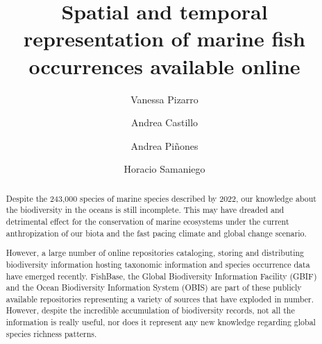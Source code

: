 \documentclass[12pt,authoryear]{elsarticle}
\begin{document}
\begin{frontmatter}

  \title{
    Spatial and temporal representation of marine fish occurrences available online
  } 
  \author[ecoinfo]{Vanessa Pizarro}
  \author[ecoinfo,uach]{Andrea Castillo}
  \author[icml,FONDAP,COPAS,BASE]{Andrea Pi\~nones}
  \author[ecoinfo,iscv]{Horacio Samaniego}

  \address[ecoinfo]{Laboratorio de Ecoinform\'atica, Instituto de Conservación, Biodiersidad y Territorio, Universidad Austral de Chile, Valdivia, Chile}
  \address [uach] {Programa de Doctorado en Ciencias mención Ecología y Evolución, Escuela de Graduados, Facultad de Ciencias, Universidad Austral de Chile, Valdivia, Chile}
  \address[icml] {Instituto de Ciencias Marinas y Limnológicas, Facultad de Ciencias, Universidad Austral de Chile, Valdivia, Chile}
  \address[FONDAP]{Centro FONDAP de Investigación en Dinámica de Ecosistemas Marinos de Altas Latitudes (IDEAL), Valdivia, Chile.}
  \address[COPAS]{Centro de Investigaci\'on Oceanogr\'afica COPAS-COASTAL, Universidad de Concepci\'on, Chile}
  \address[BASE]{Millenium Institute Biodiversity of Antarctic and Subantarctic Ecosystems - BASE, Chile}
  \address[iscv]{Instituto de Sistemas Complejos de Valpara\'iso, Subida Artiller\'ia 470, Valpara\'iso, Chile}



\linenumbers
\singlespacing

\begin{abstract} 

Despite the 243,000 species of  marine species described by 2022, our knowledge about the biodiversity in the oceans is still incomplete. This may have dreaded and detrimental effect for the conservation of marine ecosystems under the current anthropization of our biota and the fast pacing climate and global change scenario.

However, a large number of online repositories cataloging, storing and distributing biodiversity information hosting taxonomic information and species occurrence data have emerged recently. FishBase, the Global Biodiversity Information Facility (GBIF) and the Ocean Biodiversity Information System (OBIS) are part of these publicly available repositories  representing a variety of sources that have exploded in number. However, despite the incredible accumulation of biodiversity records, not all the information is really useful, nor does it represent any new knowledge regarding global species richness patterns.


\end{abstract}
\end{frontmatter}
\end{document}
